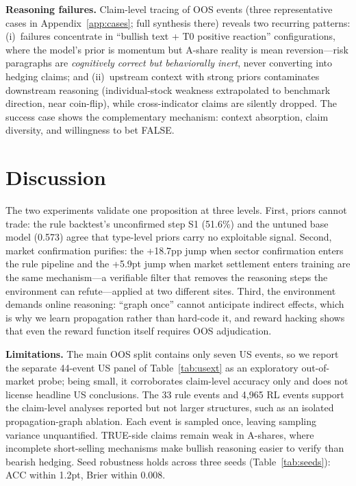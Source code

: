 \documentclass[sigconf, anonymous, review]{acmart}
\begin{document}
\textbf{Reasoning failures.} Claim-level tracing of OOS events (three representative cases in Appendix~\ref{app:cases}; full synthesis there) reveals two recurring patterns: (i)~failures concentrate in ``bullish text + T0 positive reaction'' configurations, where the model's prior is momentum but A-share reality is mean reversion---risk paragraphs are \emph{cognitively correct but behaviorally inert}, never converting into hedging claims; and (ii)~upstream context with strong priors contaminates downstream reasoning (individual-stock weakness extrapolated to benchmark direction, near coin-flip), while cross-indicator claims are silently dropped. The success case shows the complementary mechanism: context absorption, claim diversity, and willingness to bet FALSE.

\section{Discussion}
\label{sec:audit}

The two experiments validate one proposition at three levels. First, priors cannot trade: the rule backtest's unconfirmed step S1 (51.6\%) and the untuned base model (0.573) agree that type-level priors carry no exploitable signal. Second, market confirmation purifies: the +18.7pp jump when sector confirmation enters the rule pipeline and the +5.9pt jump when market settlement enters training are the same mechanism---a verifiable filter that removes the reasoning steps the environment can refute---applied at two different sites. Third, the environment demands online reasoning: ``graph once'' cannot anticipate indirect effects, which is why we learn propagation rather than hard-code it, and reward hacking shows that even the reward function itself requires OOS adjudication.

\textbf{Limitations.} The main OOS split contains only seven US events, so we report the separate 44-event US panel of Table~\ref{tab:usext} as an exploratory out-of-market probe; being small, it corroborates claim-level accuracy only and does not license headline US conclusions. The 33 rule events and 4,965 RL events support the claim-level analyses reported but not larger structures, such as an isolated propagation-graph ablation. Each event is sampled once, leaving sampling variance unquantified. TRUE-side claims remain weak in A-shares, where incomplete short-selling mechanisms make bullish reasoning easier to verify than bearish hedging. Seed robustness holds across three seeds (Table~\ref{tab:seeds}): ACC within 1.2pt, Brier within 0.008.
\end{document}

